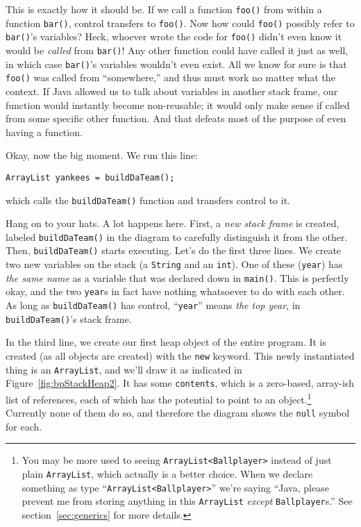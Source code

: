 This is exactly how it should be. If we call a function \texttt{foo()} from
within a function \texttt{bar()}, control transfers to \texttt{foo()}. Now how
could \texttt{foo()} possibly refer to \texttt{bar()}'s variables? Heck,
whoever wrote the code for \texttt{foo()} didn't even know it would be
\textit{called} from \texttt{bar()}! Any other function could have called it
just as well, in which case \texttt{bar()}'s variables wouldn't even exist.
All we know for sure is that \texttt{foo()} was called from ``somewhere,'' and
thus must work no matter what the context. If Java allowed us to talk about
variables in another stack frame, our function would instantly become
non-reusable; it would only make sense if called from some specific other
function. And that defeats most of the purpose of even having a function.

Okay, now the big moment. We run this line:

\begin{Verbatim}[fontsize=\small,samepage=true]
        ArrayList yankees = buildDaTeam();
\end{Verbatim}

which calls the \texttt{buildDaTeam()} function and transfers control to it.

Hang on to your hats. A lot happens here. First, a \textit{new stack frame} is
created, labeled \texttt{buildDaTeam()} in the diagram to carefully
distinguish it from the other. Then, \texttt{buildDaTeam()} starts executing.
Let's do the first three lines. We create two new variables on the stack
(a \texttt{String} and an \texttt{int}). One of these (\texttt{year}) has
\textit{the same name} as a variable that was declared down in
\texttt{main()}. This is perfectly okay, and the two \texttt{year}s in fact
have nothing whatsoever to do with each other. As long as
\texttt{buildDaTeam()} has control, ``\texttt{year}'' means \textit{the top
year}, in \texttt{buildDaTeam()}'s stack frame.

In the third line, we create our first heap object of the entire program. It
is created (as all objects are created) with the \texttt{new} keyword. This
newly instantiated thing is an \texttt{ArrayList}, and we'll draw it as
indicated in Figure~\ref{fig:bpStackHeap2}. It has some \texttt{contents},
which is a zero-based, array-ish list of references, each of which has the
potential to point to an object.\footnote{You may be more used to seeing
\texttt{ArrayList<Ballplayer>} instead of just plain \texttt{ArrayList}, which
actually is a better choice. When we declare something as type
``\texttt{ArrayList<Ballplayer>}'' we're saying ``Java, please prevent me from
storing anything in this \texttt{ArrayList} \textit{except}
\texttt{Ballplayer}s.'' See section~\ref{sec:generics} for more details.}
Currently none of them do so, and therefore the diagram shows the
\texttt{null} symbol for each.


